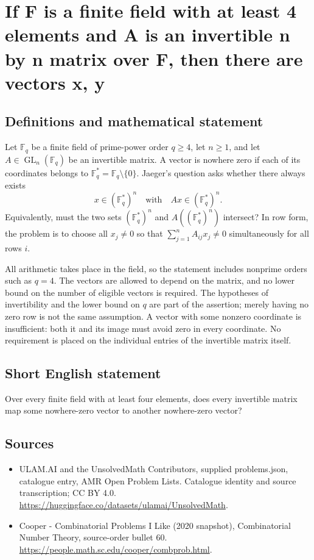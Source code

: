 \documentclass[11pt,a4paper]{article}
\begin{document}
\section*{If F is a finite field with at least 4 elements and A is an invertible n by n matrix over F, then there are vectors x, y}\label{statement}

\subsection{Definitions and mathematical statement}
Let $\mathbb F_q$ be a finite field of prime-power order $q\ge4$,
let $n\ge1$, and let $A\in\operatorname{GL}_n(\mathbb F_q)$ be
an invertible matrix. A vector is nowhere zero if each of its
coordinates belongs to $\mathbb F_q^*=\mathbb F_q\setminus\{0\}$.
Jaeger's question asks whether there always exists
\[
              x\in(\mathbb F_q^*)^n
                     \quad\text{with}\quad
              Ax\in(\mathbb F_q^*)^n.
\]
Equivalently, must the two sets
$(\mathbb F_q^*)^n$ and $A((\mathbb F_q^*)^n)$ intersect?
In row form, the problem is to choose all $x_j\ne0$ so that
$\sum_{j=1}^n A_{ij}x_j\ne0$ simultaneously for all rows $i$.

All arithmetic takes place in the field, so the statement includes
nonprime orders such as $q=4$. The vectors are allowed to depend
on the matrix, and no lower bound on the number of eligible
vectors is required. The hypotheses of invertibility and the
lower bound on $q$ are part of the assertion; merely having no
zero row is not the same assumption. A vector with some nonzero
coordinate is insufficient: both it and its image must avoid
zero in every coordinate. No requirement is placed on the
individual entries of the invertible matrix itself.
\subsection{Short English statement}
Over every finite field with at least four elements, does every invertible matrix map some nowhere-zero vector to another nowhere-zero vector?
\subsection{Sources}
\begin{itemize}
\item[S1] ULAM.AI and the UnsolvedMath Contributors, supplied problems.json, catalogue entry, AMR Open Problem Lists. Catalogue identity and source transcription; CC BY 4.0.
\url{https://huggingface.co/datasets/ulamai/UnsolvedMath}.
\item[S2] Cooper - Combinatorial Problems I Like (2020 snapshot), Combinatorial Number Theory, source-order bullet 60. 
\url{https://people.math.sc.edu/cooper/combprob.html}.
\end{itemize}
\end{document}
